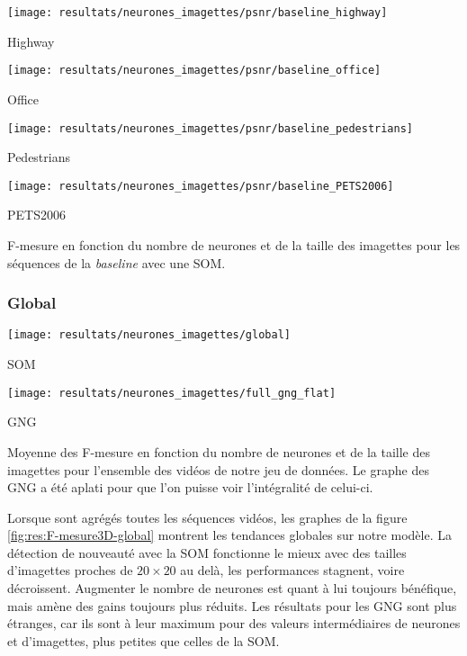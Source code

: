 	\begin{figureth}
		\begin{subfigureth}{.45\textwidth}
			\texttt{[image: resultats/neurones\_imagettes/psnr/baseline\_highway]}\caption{Highway}
		\end{subfigureth}
		\hfill
		\begin{subfigureth}{.45\textwidth}
			\texttt{[image: resultats/neurones\_imagettes/psnr/baseline\_office]}\caption{Office}
		\end{subfigureth}
		\begin{subfigureth}{.45\textwidth}
			\texttt{[image: resultats/neurones\_imagettes/psnr/baseline\_pedestrians]}\caption{Pedestrians}
		\end{subfigureth}
		\hfill
		\begin{subfigureth}{.45\textwidth}
			\texttt{[image: resultats/neurones\_imagettes/psnr/baseline\_PETS2006]}\caption{PETS2006}
		\end{subfigureth}
		\caption[Nombre de neurones et de taille des imagettes, PSNR/SOM/baseline]{F-mesure en fonction du nombre de neurones et de la taille des imagettes pour les séquences de la \textit{baseline} avec une SOM.}\label{fig:res:F-mesure3D-baselineSOM}
	\end{figureth}
	
	\subsubsection{Global}

	\begin{figureth}
		\begin{subfigureth}{.45\textwidth}
			\texttt{[image: resultats/neurones\_imagettes/global]}\caption{SOM}
		\end{subfigureth}
		\begin{subfigureth}{.45\textwidth}
			\texttt{[image: resultats/neurones\_imagettes/full\_gng\_flat]}\caption{GNG}
		\end{subfigureth}
		\caption[Nombre de neurones et de taille des imagettes, Global]{Moyenne des F-mesure en fonction du nombre de neurones et de la taille des imagettes pour l'ensemble des vidéos de notre jeu de données. Le graphe des GNG a été aplati pour que l'on puisse voir l'intégralité de celui-ci.}\label{fig:res:F-mesure3D-global}
	\end{figureth}

	Lorsque sont agrégés toutes les séquences vidéos, les graphes de la figure \ref{fig:res:F-mesure3D-global} montrent les tendances globales sur notre modèle. La détection de nouveauté avec la SOM fonctionne le mieux avec des tailles d'imagettes proches de $20\times20$ au delà, les performances stagnent, voire décroissent. Augmenter le nombre de neurones est quant à lui toujours bénéfique, mais amène des gains toujours plus réduits. Les résultats pour les GNG sont plus étranges, car ils sont à leur maximum pour des valeurs intermédiaires de neurones et d'imagettes, plus petites que celles de la SOM.


